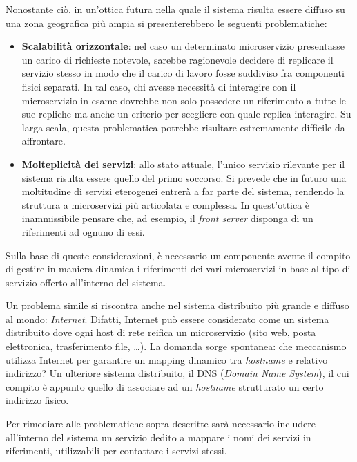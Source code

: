 \documentclass[a4paper,12pt]{report}
\begin{document}
Nonostante ciò, in un'ottica futura nella quale il sistema risulta essere diffuso su una zona geografica più ampia si presenterebbero le seguenti problematiche:
\begin{itemize}
	\item \textbf{Scalabilità orizzontale}: nel caso un determinato microservizio presentasse un carico di richieste notevole, sarebbe ragionevole decidere di replicare il servizio stesso in modo che il carico di lavoro fosse suddiviso fra componenti fisici separati. In tal caso, chi avesse necessità di interagire con il microservizio in esame dovrebbe non solo possedere un riferimento a tutte le sue repliche ma anche un criterio per scegliere con quale replica interagire. Su larga scala, questa problematica potrebbe risultare estremamente difficile da affrontare.
	\item \textbf{Molteplicità dei servizi}: allo stato attuale, l'unico servizio rilevante per il sistema risulta essere quello del primo soccorso. Si prevede che in futuro una moltitudine di servizi eterogenei entrerà a far parte del sistema, rendendo la struttura a microservizi più articolata e complessa. In quest'ottica è inammissibile pensare che, ad esempio, il \emph{front server} disponga di un riferimenti ad ognuno di essi. 
\end{itemize}

Sulla base di queste considerazioni, è necessario un componente avente il compito di gestire in maniera dinamica i riferimenti dei vari microservizi in base al tipo di servizio offerto all'interno del sistema. 

Un problema simile si riscontra anche nel sistema distribuito più grande e diffuso al mondo: \emph{Internet}. Difatti, Internet può essere considerato come un sistema distribuito dove ogni host di rete reifica un microservizio (sito web, posta elettronica, trasferimento file, \dots). La domanda sorge spontanea: che meccanismo utilizza Internet per garantire un mapping dinamico tra \emph{hostname} e relativo indirizzo? Un ulteriore sistema distribuito, il DNS (\emph{Domain Name System}), il cui compito è appunto quello di associare ad un \emph{hostname} strutturato un certo indirizzo fisico.

Per rimediare alle problematiche sopra descritte sarà necessario includere all'interno del sistema un servizio dedito a mappare i nomi dei servizi in riferimenti, utilizzabili per contattare i servizi stessi.
\end{document}
